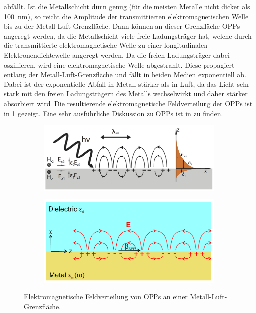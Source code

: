 abfällt. Ist die Metallschicht dünn genug (für die meisten Metalle nicht dicker als \SI{100}{\nm}), so reicht die Amplitude der transmittierten elektromagnetischen
Welle bis zu der Metall-Luft-Grenzfläche. Dann können an dieser Grenzfläche OPPs angeregt werden, da die Metallschicht viele freie Ladungsträger hat, welche
durch die transmittierte elektromagnetische Welle zu einer longitudinalen Elektronendichtewelle angeregt werden. Da die freien Ladungsträger dabei oszillieren, wird
eine elektromagnetische Welle abgestrahlt. Diese propagiert entlang der Metall-Luft-Grenzfläche und fällt in beiden Medien exponentiell ab. Dabei ist der exponentielle
Abfall in Metall stärker als in Luft, da das Licht sehr stark mit den freien Ladungsträgern des Metalls wechselwirkt und daher stärker absorbiert wird.
Die resultierende elektromagnetische Feldverteilung der OPPs ist in \cref{fig:feldverteilung} gezeigt. Eine sehr ausführliche Diskussion zu OPPs ist in \cite{nano} zu finden.
\begin{figure}[H]
    \centering
    \begin{subfigure}{0.4\textwidth}
        \centering
        \includegraphics[width=\linewidth]{../figs/Sketch_of_surface_plasmon}
        \caption{\cite{wiki:sp}}
    \end{subfigure}
    \begin{subfigure}{0.4\textwidth}
        \centering
        \includegraphics[width=\linewidth]{../figs/field_scheme}
        \caption{\cite{linden_photonics}}
    \end{subfigure}
    \caption{Elektromagnetische Feldverteilung von OPPs an einer Metall-Luft-Grenzfläche.}\label{fig:feldverteilung}
\end{figure}
